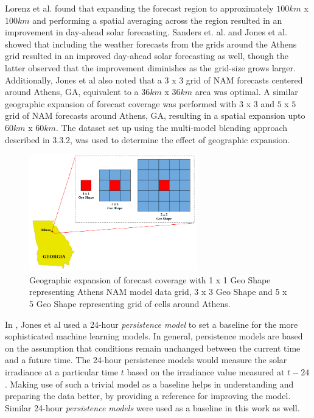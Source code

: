 Lorenz et al. \cite{expansion_lorenz} found that expanding the forecast region to approximately $100 km$ x $100 km$ and performing a spatial averaging across the region resulted in an improvement in day-ahead solar forecasting. Sanders et. al. \cite{publication_sanders} and Jones et al. \cite{thesis_zach} showed that including the weather forecasts from the grids around the Athens grid resulted in an improved day-ahead solar forecasting as well, though the latter observed that the improvement diminishes as the grid-size grows larger. Additionally, Jones et al also noted that a $3$ x $3$ grid of NAM forecasts centered around Athens, GA, equivalent to a $36km$ x $36km$ area was optimal. A similar geographic expansion of forecast coverage was performed with $3$ x $3$ and $5$ x $5$ grid of NAM forecasts around Athens, GA, resulting in a spatial expansion upto $60km$ x $60km$. The dataset set up using the multi-model blending approach described in 3.3.2, was used to determine the effect of geographic expansion.

\begin{figure}[ht]
    \begin{center}
    	\includegraphics[width=0.65\textwidth]{chapter3/fig_geoshapes.png}
    	\caption[Geographic expansion of forecast coverage around Athens NAM model data grid]{Geographic expansion of forecast coverage with 1 x 1 Geo Shape representing Athens NAM model data grid, 3 x 3 Geo Shape and 5 x 5 Geo Shape representing grid of cells around Athens.}
    	\label{fig:fig_geoshapes}
    \end{center}
\end{figure}

\par In \cite{thesis_zach}, Jones et al used a 24-hour \textit{persistence model} to set a baseline for the more sophisticated machine learning models. In general, persistence models are based on the assumption that conditions remain unchanged between the current time and a future time. The 24-hour persistence models would measure the solar irradiance at a particular time $t$ based on the irradiance value measured at $t-24$. Making use of such a trivial model as a baseline helps in understanding and preparing the data better, by providing a reference for improving the model. Similar 24-hour \textit{persistence models} were used as a baseline in this work as well.

